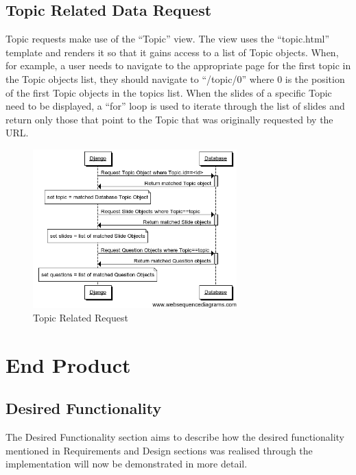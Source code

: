 \documentclass{l3proj}
\begin{document}
{\subsection{Topic Related Data Request}
Topic requests make use of the “Topic” view. The view uses the “topic.html” template and renders it so that it gains access to a list of Topic objects. When, for example, a user needs to navigate to the appropriate page for the first topic in the Topic objects list, they should navigate to “/topic/0” where 0 is the position of the first Topic objects in the topics list. When the slides of a specific Topic need to be displayed, a “for” loop is used to iterate through the list of slides and return only those that point to the Topic that was originally requested by the URL.

\begin{figure}[h!]
   \caption{Topic Related Request}
   \centering
     \includegraphics[width=0.7\textwidth]{images/topicRelatedRequest.png}
\end{figure} 

\section{End Product}
\subsection{Desired Functionality}
The Desired Functionality section aims to describe how the desired functionality mentioned in Requirements and Design sections was realised through the implementation will now be demonstrated in more detail.

}
\end{document}
